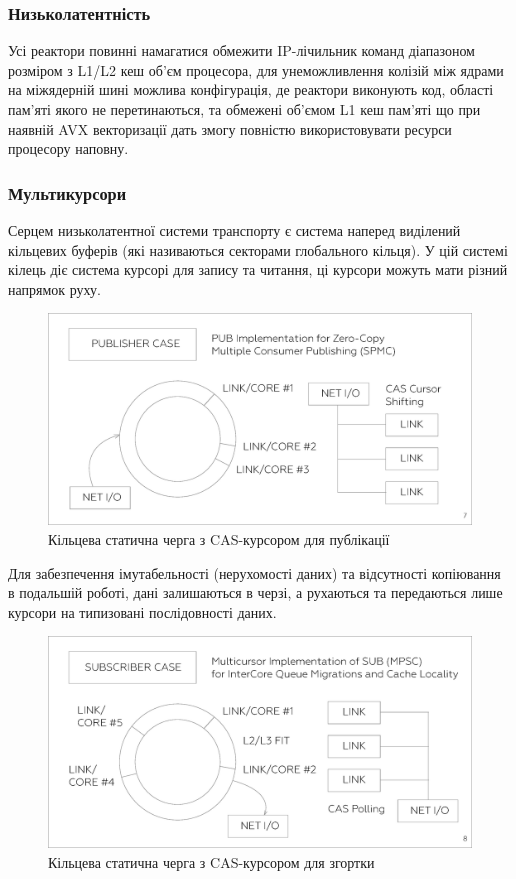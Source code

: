 \subsubsection{Низьколатентність}
Усі реактори повинні намагатися обмежити IP-лічильник команд
діапазоном розміром з L1/L2 кеш об'єм процесора, для унеможливлення
колізій між ядрами на міжядерній шині можлива конфігурація, де
реактори виконують код, області пам'яті якого не перетинаються,
та обмежені об'ємом L1 кеш пам'яті що при наявній AVX векторизації
дать змогу повністю використовувати ресурси процесору наповну.

\subsubsection{Мультикурсори}
Серцем низьколатентної системи транспорту є система наперед виділений
кільцевих буферів (які називаються секторами глобального кільця). У цій
системі кілець діє система курсорі для запису та читання, ці курсори
можуть мати різний напрямок руху.
\begin{figure}[h]
  \centerline{\includegraphics[scale=0.25]{pub.eps}}
  \caption{Кільцева статична черга з CAS-курсором для публікації}
\end{figure}
Для забезпечення імутабельності (нерухомості даних) та відсутності
копіювання в подальшій роботі, дані залишаються в черзі, а рухаються та передаються
лише курсори на типизовані послідовності даних.
\begin{figure}[h]
  \centerline{\includegraphics[scale=0.25]{sub.eps}}
  \caption{Кільцева статична черга з CAS-курсором для згортки}
\end{figure}

